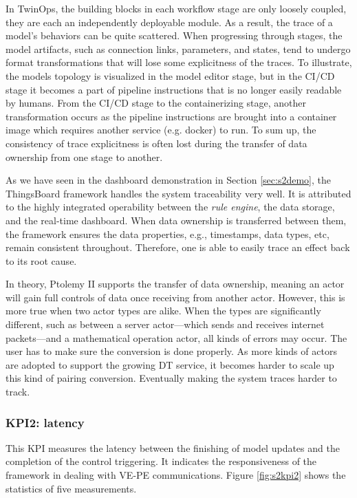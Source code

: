 In TwinOps, the building blocks in each workflow stage are only loosely coupled, they are each an independently deployable module. As a result, the trace of a model's behaviors can be quite scattered. When progressing through stages, the model artifacts, such as connection links, parameters, and states, tend to undergo format transformations that will lose some explicitness of the traces.
To illustrate, the models topology is visualized in the model editor stage, but in the CI/CD stage it becomes a part of pipeline instructions that is no longer easily readable by humans. From the CI/CD stage to the containerizing stage, another transformation occurs as the pipeline instructions are brought into a container image which requires another service (e.g. docker) to run. To sum up, the consistency of trace explicitness is often lost during the transfer of data ownership from one stage to another.

As we have seen in the dashboard demonstration in Section \ref{sec:s2demo}, the ThingsBoard framework handles the system traceability very well. It is attributed to the highly integrated operability between the \textit{rule engine}, the data storage, and the real-time dashboard. When data ownership is transferred between them, the framework ensures the data properties, e.g., timestamps, data types, etc, remain consistent throughout. Therefore, one is able to easily trace an effect back to its root cause.

In theory, Ptolemy II supports the transfer of data ownership, meaning an actor will gain full controls of data once receiving from another actor. However, this is more true when two actor types are alike. When the types are significantly different, such as between a server actor---which sends and receives internet packets---and a mathematical operation actor, all kinds of errors may occur. The user has to make sure the conversion is done properly. As more kinds of actors are adopted to support the growing DT service, it becomes harder to scale up this kind of pairing conversion. Eventually making the system traces harder to track.

\subsubsection{KPI2: latency}
This KPI measures the latency between the finishing of model updates and the completion of the control triggering. It indicates the responsiveness of the framework in dealing with VE-PE communications. Figure \ref{fig:s2kpi2} shows the statistics of five measurements.

